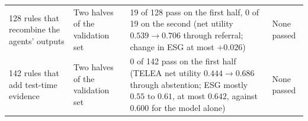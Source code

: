 \begin{table}[!htbp]
\begin{adjustbox}{max width=\linewidth}
\begin{tabular}{L{4.6cm}L{2.6cm}L{8.2cm}L{1.9cm}}
128 rules that recombine the agents' outputs & Two halves of the validation set & 19 of 128 pass on the first half, 0 of 19 on the second (net utility $0.539 \to 0.706$ through referral; change in ESG at most $+0.026$) & None passed \\
142 rules that add test-time evidence & Two halves of the validation set & 0 of 142 pass on the first half (TELEA net utility $0.444 \to 0.686$ through abstention; ESG mostly $0.55$ to $0.61$, at most $0.642$, against $0.600$ for the model alone) & None passed \\
\bottomrule
\end{tabular}
\end{adjustbox}
\end{table}

